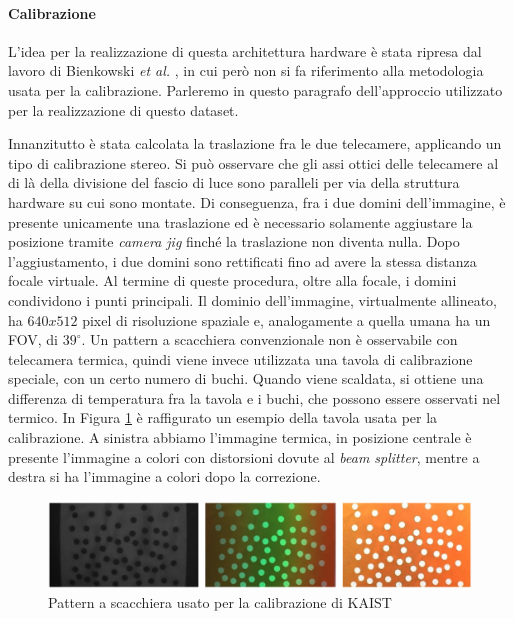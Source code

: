 \paragraph{Calibrazione} L'idea per la realizzazione di questa architettura hardware è stata ripresa dal lavoro di Bienkowski \textit{et al.} \cite{bienkowski2012}, in cui però non si fa riferimento alla metodologia usata per la calibrazione. Parleremo in questo paragrafo dell'approccio utilizzato per la realizzazione di questo dataset. 

Innanzitutto è stata calcolata la traslazione fra le due telecamere, applicando un tipo di calibrazione stereo. Si può osservare che gli assi ottici delle telecamere al di là della divisione del fascio di luce sono paralleli per via della struttura hardware su cui sono montate. Di conseguenza, fra i due domini dell’immagine, è presente unicamente una traslazione ed è necessario solamente aggiustare la posizione tramite \textit{camera jig} finché la traslazione non diventa nulla. Dopo l’aggiustamento, i due domini sono rettificati fino ad avere la stessa distanza focale virtuale. Al termine di queste procedura, oltre alla focale, i domini condividono i punti principali.
Il dominio dell’immagine, virtualmente allineato, ha $640 x 512$ pixel di risoluzione spaziale e, analogamente a quella umana ha un \ac{FOV}, di $39^\circ$. Un pattern a scacchiera convenzionale non è osservabile con telecamera termica, quindi viene invece utilizzata una tavola di calibrazione speciale, con un certo numero di buchi. Quando viene scaldata, si ottiene una differenza di temperatura fra la tavola e i buchi, che possono essere osservati nel termico. In Figura \ref{fig:hole_pattern} è raffigurato un esempio della tavola usata per la calibrazione. A sinistra abbiamo l'immagine termica, in posizione centrale è presente l'immagine a colori con distorsioni dovute al \textit{beam splitter}, mentre a destra si ha l'immagine a colori dopo la correzione.  

\begin{figure}[]
    \centering
    \includegraphics[width=\textwidth]{images/hole_pattern.jpg}
    \caption{Pattern a scacchiera usato per la calibrazione di KAIST}
    \label{fig:hole_pattern}
\end{figure} 

